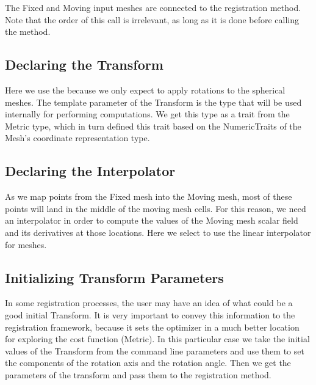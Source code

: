 \documentclass{InsightArticle}
\begin{document}
The Fixed and Moving input meshes are connected to the registration method.
Note that the order of this call is irrelevant, as long as it is done before
calling the  method.

\begin{center}

\end{center}

\subsection{Declaring the Transform}

Here we use the  because we only expect to apply
rotations to the spherical meshes. The template parameter of the Transform is
the type that will be used internally for performing computations. We get this
type as a trait from the Metric type, which in turn defined this trait based on
the NumericTraits of the Mesh's coordinate representation type.

\begin{center}

\end{center}


\subsection{Declaring the Interpolator}

As we map points from the Fixed mesh into the Moving mesh, most of these points
will land in the middle of the moving mesh cells. For this reason, we need an
interpolator in order to compute the values of the Moving mesh scalar field and
its derivatives at those locations. Here we select to use the linear
interpolator for meshes.

\begin{center}

\end{center}


\subsection{Initializing Transform Parameters}

In some registration processes, the user may have an idea of what could be a
good initial Transform. It is very important to convey this information to the
registration framework, because it sets the optimizer in a much better location
for exploring the cost function (Metric).  In this particular case we take the
initial values of the Transform from the command line parameters and use them
to set the components of the rotation axis and the rotation angle. Then we get
the parameters of the transform and pass them to the registration method.
\end{document}
